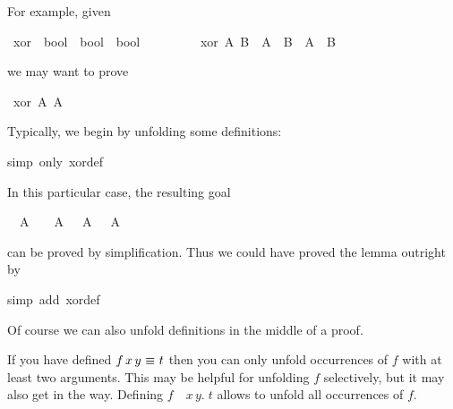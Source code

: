 \begin{isabellebody}
\begin{isamarkuptext}
For example, given%
\end{isamarkuptext}%
\isamarkuptrue%
\ xor\ {\isacharcolon}{\isacharcolon}\ {\isachardoublequote}bool\ {\isasymRightarrow}\ bool\ {\isasymRightarrow}\ bool{\isachardoublequote}\isanewline
\ \ \ \ \ \ \ \ \ {\isachardoublequote}xor\ A\ B\ {\isasymequiv}\ {\isacharparenleft}A\ {\isasymand}\ {\isasymnot}B{\isacharparenright}\ {\isasymor}\ {\isacharparenleft}{\isasymnot}A\ {\isasymand}\ B{\isacharparenright}{\isachardoublequote}\isamarkupfalse%
%
\begin{isamarkuptext}%
\noindent
we may want to prove%
\end{isamarkuptext}%
\isamarkuptrue%
\ {\isachardoublequote}xor\ A\ {\isacharparenleft}{\isasymnot}A{\isacharparenright}{\isachardoublequote}\isamarkupfalse%
%
\begin{isamarkuptxt}%
\noindent
Typically, we begin by unfolding some definitions:
%
\end{isamarkuptxt}%
\isamarkuptrue%
simp\ only{\isacharcolon}\ xor{\isacharunderscore}def{\isacharparenright}\isamarkupfalse%
%
\begin{isamarkuptxt}%
\noindent
In this particular case, the resulting goal
\begin{isabelle}%
\ {}{\isachardot}\ A\ {\isasymand}\ {\isasymnot}\ {\isasymnot}\ A\ {\isasymor}\ {\isasymnot}\ A\ {\isasymand}\ {\isasymnot}\ A%
\end{isabelle}
can be proved by simplification. Thus we could have proved the lemma outright by%
\end{isamarkuptxt}%
\isamarkuptrue%
\isamarkupfalse%
\isamarkupfalse%
simp\ add{\isacharcolon}\ xor{\isacharunderscore}def{\isacharparenright}\isamarkupfalse%
\isamarkupfalse%
%
\begin{isamarkuptext}%
\noindent
Of course we can also unfold definitions in the middle of a proof.

\begin{warn}
  If you have defined $f\,x\,y~\emph{$\equiv$}~t$ then you can only unfold
  occurrences of $f$ with at least two arguments. This may be helpful for unfolding
  $f$ selectively, but it may also get in the way. Defining
  $f$~\isasymequiv~\isasymlambda$x\,y.\;t$ allows to unfold all occurrences of $f$.
\end{warn}


\end{isamarkuptext}
\end{isabellebody}
